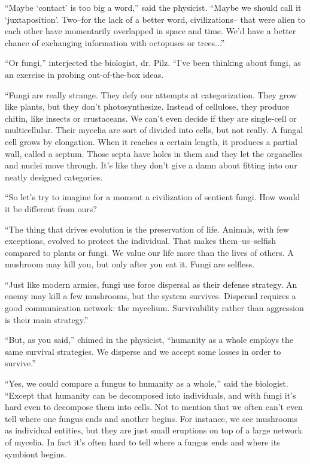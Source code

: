 \documentclass{memoir}
\begin{document}
``Maybe `contact' is too big a word,'' said the physicist. ``Maybe we should call it `juxtaposition'. Two--for the lack of a better word, civilizations-- that were alien to each other have momentarily overlapped in space and time. We'd have a better chance of exchanging information with octopuses or trees...''

``Or fungi,'' interjected the biologist, dr. Pilz. ``I've been thinking about fungi, as an exercise in probing out-of-the-box ideas.

``Fungi are really strange. They defy our attempts at categorization. They grow like plants, but they don't photosynthesize. Instead of cellulose, they produce chitin, like insects or crustaceans. We can't even decide if they are single-cell or multicellular. Their mycelia are sort of divided into cells, but not really. A fungal cell grows by elongation. When it reaches a certain length, it produces a partial wall, called a septum. Those septa have holes in them and they let the organelles and nuclei move through. It's like they don't give a damn about fitting into our neatly designed categories. 

``So let's try to imagine for a moment a civilization of sentient fungi. How would it be different from ours?

``The thing that drives evolution is the preservation of life. Animals, with few exceptions, evolved to protect the individual. That makes them--us--selfish compared to plants or fungi. We value our life more than the lives of others. A mushroom may kill you, but only after you eat it. Fungi are selfless. 

``Just like modern armies, fungi use force dispersal as their defense strategy. An enemy may kill a few mushrooms, but the system survives. Dispersal requires a good communication network: the mycelium. Survivability rather than aggression is their main strategy.''

``But, as you said,'' chimed in the physicist, ``humanity as a whole employs the same survival strategies. We disperse and we accept some losses in order to survive.''

``Yes, we could compare a fungus to humanity as a whole,'' said the biologist. ``Except that humanity can be decomposed into individuals, and with fungi it's hard even to decompose them into cells. Not to mention that we often can't even tell where one fungus ends and another begins. For instance, we see mushrooms as individual entities, but they are just small eruptions on top of a large network of mycelia. In fact it's often hard to tell where a fungus ends and where its symbiont begins.
\end{document}

